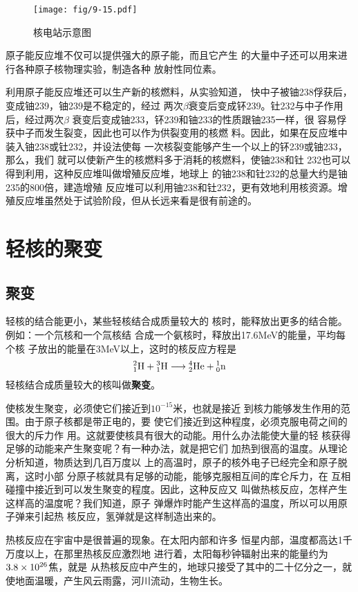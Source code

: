 \begin{figure}[htp]
    \centering
    \texttt{[image: fig/9-15.pdf]}
    \caption{核电站示意图}
\end{figure}

原子能反应堆不仅可以提供强大的原子能，而且它产生
的大量中子还可以用来进行各种原子核物理实验，制造各种
放射性同位素。

利用原子能反应堆还可以生产新的核燃料，从实验知道，
快中子被铀238俘获后，变成铀239，铀239是不稳定的，经过
两次$\beta$衰变后变成钚239。钍232与中子作用后，经过两次$\beta$
衰变后变成铀233，钚239和铀233的性质跟铀235一样，很
容易俘获中子而发生裂变，因此也可以作为供裂变用的核燃
料。因此，如果在反应堆中装入铀238或钍232，并设法使每
一次核裂变能够产生一个以上的钚239或铀233，那么，我们
就可以使新产生的核燃料多于消耗的核燃料，使铀238和钍
232也可以得到利用，这种反应堆叫做增殖反应堆，地球上
的铀238和钍232的总量大约是铀235的800倍，建造增殖
反应堆可以利用铀238和钍232，更有效地利用核资源。增
殖反应堆虽然处于试验阶段，但从长远来看是很有前途的。

\section{轻核的聚变}
\subsection{聚变}
轻核的结合能更小，某些轻核结合成质量较大的
核时，能释放出更多的结合能。例如：一个氘核和一个氚核结
合成一个氨核时，释放出17.6MeV的能量，平均每个核
子放出的能量在3MeV以上，这时的核反应方程是
\[\atom{H}{2}{1}+\atom{H}{3}{1}\longrightarrow \atom{He}{4}{2}+\atom{n}{1}{0} 
    \]
轻核结合成质量较大的核叫做\textbf{聚变}。

使核发生聚变，必须使它们接近到$10^{-15}$米，也就是接近
到核力能够发生作用的范围。由于原子核都是带正电的，要
使它们接近到这种程度，必须克服电荷之间的很大的斥力作
用。这就要使核具有很大的动能。用什么办法能使大量的轻
核获得足够的动能来产生聚变呢？有一种办法，就是把它们
加热到很高的温度。从理论分析知道，物质达到几百万度以
上的高温时，原子的核外电子已经完全和原子脱离，这时小部
分原子核就具有足够的动能，能够克服相互间的库仑斥力，在
互相碰撞中接近到可以发生聚变的程度。因此，这种反应又
叫做热核反应，怎样产生这样高的温度呢？我们知道，原子
弹爆炸时能产生这样高的温度，所以可以用原子弹来引起热
核反应，氢弹就是这样制造出来的。

热核反应在宇宙中是很普遍的现象。在太阳内部和许多
恒星内部，温度都高达1千万度以上，在那里热核反应激烈地
进行着，太阳每秒钟辐射出来的能量约为$3.8\x10^{26}$焦，就是
从热核反应中产生的，地球只接受了其中的二十亿分之一，就
使地面温暖，产生风云雨露，河川流动，生物生长。

